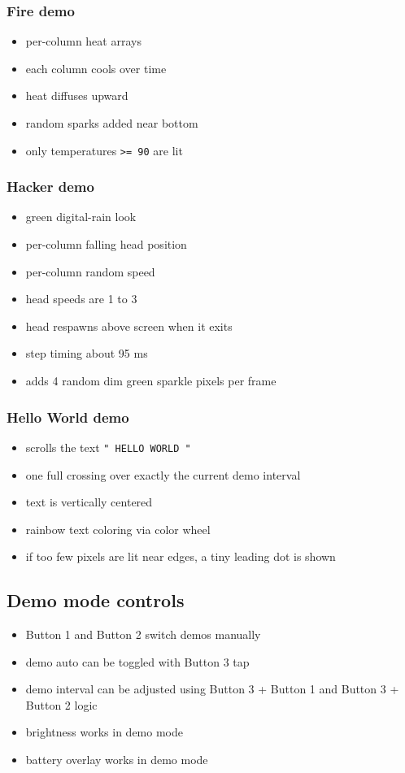 \documentclass[11pt]{article}
\begin{document}
\subsubsection*{Fire demo}
\begin{itemize}
  \item per-column heat arrays
  \item each column cools over time
  \item heat diffuses upward
  \item random sparks added near bottom
  \item only temperatures \texttt{>= 90} are lit
\end{itemize}

\subsubsection*{Hacker demo}
\begin{itemize}
  \item green digital-rain look
  \item per-column falling head position
  \item per-column random speed
  \item head speeds are 1 to 3
  \item head respawns above screen when it exits
  \item step timing about 95 ms
  \item adds 4 random dim green sparkle pixels per frame
\end{itemize}

\subsubsection*{Hello World demo}
\begin{itemize}
  \item scrolls the text \texttt{" HELLO WORLD "}
  \item one full crossing over exactly the current demo interval
  \item text is vertically centered
  \item rainbow text coloring via color wheel
  \item if too few pixels are lit near edges, a tiny leading dot is shown
\end{itemize}

\subsection{Demo mode controls}
\begin{itemize}
  \item Button 1 and Button 2 switch demos manually
  \item demo auto can be toggled with Button 3 tap
  \item demo interval can be adjusted using Button 3 + Button 1 and Button 3 + Button 2 logic
  \item brightness works in demo mode
  \item battery overlay works in demo mode
\end{itemize}
\end{document}
